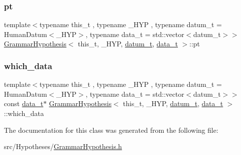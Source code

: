 \mbox{\label{class_grammar_hypothesis_a3dfa8da300156a045ac542bdd5364e0f}} 
\subsubsection{\texorpdfstring{pt}{pt}}
{\footnotesize\ttfamily template$<$typename this\+\_\+t , typename \+\_\+\+H\+YP , typename datum\+\_\+t  = Human\+Datum$<$\+\_\+\+H\+Y\+P$>$, typename data\+\_\+t  = std\+::vector$<$datum\+\_\+t$>$$>$ \\
\hyperlink{class_grammar_hypothesis}{Grammar\+Hypothesis}$<$ this\+\_\+t, \+\_\+\+H\+YP, \hyperlink{class_bayesable_a9f1a6c0cd7855550fa10b1a8f13a5867}{datum\+\_\+t}, \hyperlink{class_bayesable_aa2788c4d7718c0a824e1d28c4c98f921}{data\+\_\+t} $>$\+::pt}

\mbox{\label{class_grammar_hypothesis_a91f16aecf3f2a1e9bd1386c846635dba}} 
\subsubsection{\texorpdfstring{which\+\_\+data}{which\_data}}
{\footnotesize\ttfamily template$<$typename this\+\_\+t , typename \+\_\+\+H\+YP , typename datum\+\_\+t  = Human\+Datum$<$\+\_\+\+H\+Y\+P$>$, typename data\+\_\+t  = std\+::vector$<$datum\+\_\+t$>$$>$ \\
const \hyperlink{class_bayesable_aa2788c4d7718c0a824e1d28c4c98f921}{data\+\_\+t}$\ast$ \hyperlink{class_grammar_hypothesis}{Grammar\+Hypothesis}$<$ this\+\_\+t, \+\_\+\+H\+YP, \hyperlink{class_bayesable_a9f1a6c0cd7855550fa10b1a8f13a5867}{datum\+\_\+t}, \hyperlink{class_bayesable_aa2788c4d7718c0a824e1d28c4c98f921}{data\+\_\+t} $>$\+::which\+\_\+data}



The documentation for this class was generated from the following file\+:\begin{DoxyCompactItemize}
\item 
src/\+Hypotheses/\hyperlink{_grammar_hypothesis_8h}{Grammar\+Hypothesis.\+h}\end{DoxyCompactItemize}
